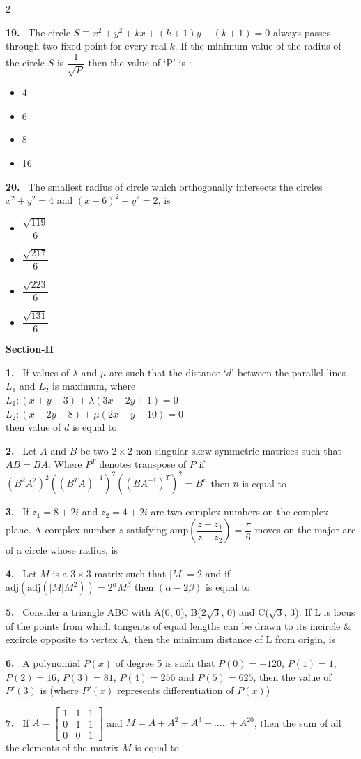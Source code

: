 \documentclass[10pt]{extarticle}
\newcommand{\sect}[1]{\par\smallskip\noindent\textbf{#1}\par}
\newcommand{\qn}[1]{\par\smallskip\noindent\textbf{#1.}~}
\newenvironment{qoptions}{\begin{itemize}[leftmargin=1.8em,itemsep=1pt,topsep=2pt,label={}]}{\end{itemize}}
\newcommand{\opt}[2]{\item[(#1)] #2}
\begin{document}
\begin{multicols}{2}
\qn{19} The circle $S\equiv x^2+y^2+kx+(k+1)y-(k+1)=0$ always passes through two fixed point for every real $k$. If the minimum value of the radius of the circle $S$ is $\dfrac1{\sqrt P}$ then the value of `P' is :
\begin{qoptions}
\opt{A}{4}
\opt{B}{6}
\opt{C}{8}
\opt{D}{16}
\end{qoptions}

\qn{20} The smallest radius of circle which orthogonally intersects the circles $x^2+y^2=4$ and $(x-6)^2+y^2=2$, is
\begin{qoptions}
\opt{A}{$\dfrac{\sqrt{119}}6$}
\opt{B}{$\dfrac{\sqrt{217}}6$}
\opt{C}{$\dfrac{\sqrt{223}}6$}
\opt{D}{$\dfrac{\sqrt{131}}6$}
\end{qoptions}

\sect{Section-II}

\qn{1} If values of $\lambda$ and $\mu$ are such that the distance `$d$' between the parallel lines $L_1$ and $L_2$ is maximum, where\\
$L_1:(x+y-3)+\lambda(3x-2y+1)=0$\\
$L_2:(x-2y-8)+\mu(2x-y-10)=0$\\
then value of $d$ is equal to

\qn{2} Let $A$ and $B$ be two $2\times2$ non singular skew symmetric matrices such that $AB=BA$. Where $P^T$ denotes transpose of $P$ if $\left(B^2A^2\right)^2\left(\left(B^TA\right)^{-1}\right)^2\left(\left(BA^{-1}\right)^T\right)^2=B^n$ then $n$ is equal to

\qn{3} If $z_1=8+2i$ and $z_2=4+2i$ are two complex numbers on the complex plane. A complex number $z$ satisfying $\text{amp}\left(\dfrac{z-z_1}{z-z_2}\right)=\dfrac\pi6$ moves on the major arc of a circle whose radius, is

\qn{4} Let $M$ is a $3\times3$ matrix such that $|M|=2$ and if $\text{adj}\left(\text{adj}\left(|M|M^2\right)\right)=2^\alpha M^\beta$ then $(\alpha-2\beta)$ is equal to

\qn{5} Consider a triangle ABC with A(0, 0), B($2\sqrt3$, 0) and C($\sqrt3$, 3). If L is locus of the points from which tangents of equal lengths can be drawn to its incircle \& excircle opposite to vertex A, then the minimum distance of L from origin, is

\qn{6} A polynomial $P(x)$ of degree 5 is such that $P(0)=-120$, $P(1)=1$, $P(2)=16$, $P(3)=81$, $P(4)=256$ and $P(5)=625$, then the value of $P'(3)$ is (where $P'(x)$ represents differentiation of $P(x)$)

\qn{7} If $A=\begin{bmatrix}1&1&1\\0&1&1\\0&0&1\end{bmatrix}$ and $M=A+A^2+A^3+\dots..+A^{20}$, then the sum of all the elements of the matrix $M$ is equal to \underline{\hspace{3em}}


\end{multicols}
\end{document}
